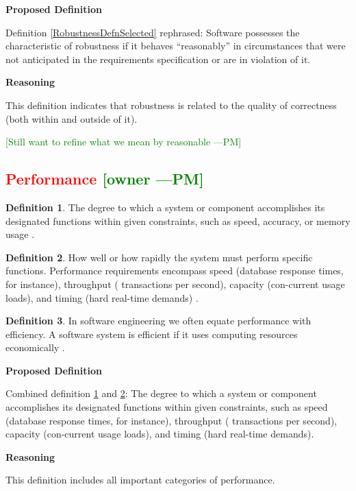 \documentclass[letterpaper,cleveref]{lipics-v2019}
\newcommand{\authornote}[3]{\textcolor{#1}{[#3 ---#2]}}
\newcommand{\authornote}[3]{}
\newcommand{\pmi}[1]{\authornote{green}{PM}{#1}} %
\newcommand{\notdone}[1]{\textcolor{red}{#1}}
\theoremstyle{definition}
\newtheorem{defn}{Definition}
\begin{document}
\noindent \textbf{Proposed Definition}

Definition \ref{RobustnessDefnSelected} rephrased: Software possesses the
characteristic of robustness if it behaves ``reasonably'' in circumstances that
were not anticipated in the requirements specification or are in violation of
it.

\noindent \textbf{Reasoning}

This definition indicates that robustness is related to the quality of
correctness (both within and outside of it). 

\pmi{Still want to refine what we mean by reasonable}

\subsection{\notdone{Performance} \pmi{owner}}

\begin{defn} \label{PerformanceDefnSelected}
The degree to which a system or component accomplishes its designated functions
within given constraints, such as speed, accuracy, or memory usage
\citep{IEEEStdGlossarySET1990}.
\end{defn}
\begin{defn} \label{PerformanceDefnSelected2}
How well or how rapidly the system must perform specific functions. Performance
requirements encompass speed (database response times, for instance), throughput
( transactions per second), capacity (con-current usage loads), and timing (hard
real-time demands) \citep{wiegers2003softreq}.
\end{defn}
\begin{defn}
In software engineering we often equate performance with efficiency. A software
system is efficient if it uses computing resources economically
\citep{ghezzi1991fundamentals}.
\end{defn}

\noindent \textbf{Proposed Definition}

Combined definition \ref{PerformanceDefnSelected} and \ref{PerformanceDefnSelected2}: The degree to which a system or component accomplishes its designated functions within given constraints, such as speed
(database response times, for instance), throughput ( transactions per second),
capacity (con-current usage loads), and timing (hard real-time demands).

\noindent \textbf{Reasoning}

This definition includes all important categories of performance. 
\end{document}
